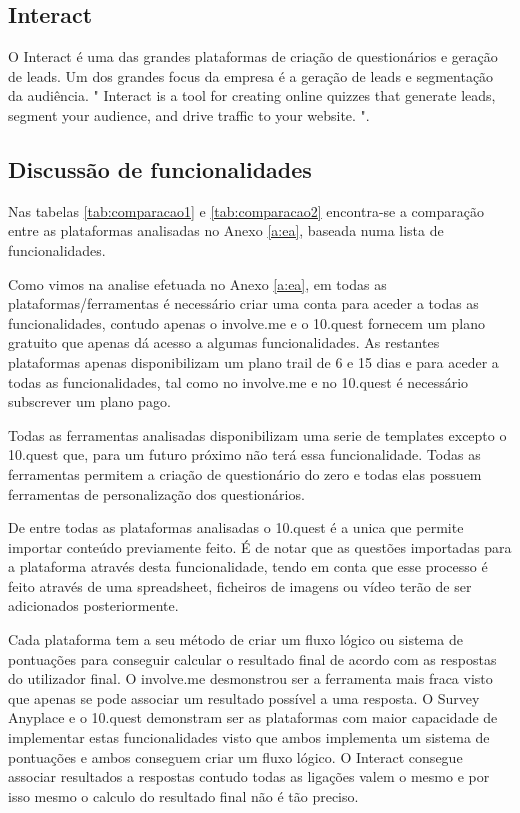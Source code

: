 \subsection{Interact}
\label{interactM}


O Interact é uma das grandes plataformas de criação de questionários e geração de leads. Um dos grandes focus da empresa é a geração de leads e segmentação da audiência. " Interact is a tool for creating online quizzes that generate leads, segment your audience, and drive traffic to your website. "\cite{interact}.


\subsection{Discussão de funcionalidades}
\label{comparacao}

Nas tabelas \ref{tab:comparacao1} e \ref{tab:comparacao2} encontra-se a comparação entre as plataformas analisadas no Anexo \ref{a:ea}, baseada numa lista de funcionalidades.

Como vimos na analise efetuada no Anexo \ref{a:ea}, em todas as plataformas/ferramentas é necessário criar uma conta para aceder a todas as funcionalidades, contudo apenas o involve.me e o 10.quest fornecem um plano gratuito que apenas dá acesso a algumas funcionalidades. As restantes plataformas apenas disponibilizam um plano trail de 6 e 15 dias e para aceder a todas as funcionalidades, tal como no involve.me e no 10.quest é necessário subscrever um plano pago.

Todas as ferramentas analisadas disponibilizam uma serie de templates excepto o 10.quest que, para um futuro próximo não terá essa funcionalidade. Todas as ferramentas permitem a criação de questionário do zero e todas elas possuem ferramentas de personalização dos questionários.

De entre todas as plataformas analisadas o 10.quest é a unica que permite importar conteúdo previamente feito. É de notar que as questões importadas para a plataforma através desta funcionalidade, tendo em conta que esse processo é feito através de uma spreadsheet, ficheiros de imagens ou vídeo terão de ser adicionados posteriormente.

Cada plataforma tem a seu método de criar um fluxo lógico ou sistema de pontuações para conseguir calcular o resultado final de acordo com as respostas do utilizador final. O involve.me desmonstrou ser a ferramenta mais fraca visto que apenas se pode associar um resultado possível a uma resposta. O Survey Anyplace e o 10.quest demonstram ser as plataformas com maior capacidade de implementar estas funcionalidades visto que ambos implementa um sistema de pontuações e ambos conseguem criar um fluxo lógico. O Interact consegue associar resultados a respostas contudo todas as ligações valem o mesmo e por isso mesmo o calculo do resultado final não é tão preciso. 

